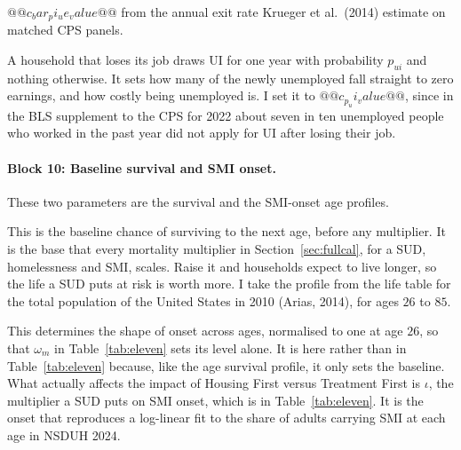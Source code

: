 \documentclass[10pt]{article}
\begin{document}
\begin{description}
$@@c_bar_pi_ue_value@@$ from the annual exit rate Krueger et al.\ (2014) estimate on
matched CPS panels.
\item[$p_{ui}$, the share of separations that receive UI.] A household that
loses its job draws UI for one year with probability $p_{ui}$ and nothing
otherwise. It sets how many of the newly unemployed fall straight to zero
earnings, and how costly being unemployed is. I set it to $@@c_p_ui_value@@$, since in the BLS supplement to the CPS for 2022 about seven in ten unemployed people who worked in the past year did not apply for UI after losing their job.
\end{description}

\paragraph{Block 10: Baseline survival and SMI onset.} These two parameters are the survival and
the SMI-onset age profiles.
\begin{description}\setlength{\itemsep}{0.25em}\setlength{\parskip}{0em}
\item[$\bar\phi(j)$, baseline survival by age.] This is the baseline chance of surviving to the
next age, before any multiplier. It is the base that every mortality multiplier in Section~\ref{sec:fullcal}, for a SUD, homelessness and SMI, scales. Raise it and households expect to live longer, so the life a SUD puts at risk is worth more. I take the profile from the life table for the total population of the United States in 2010 (Arias, 2014), for ages $26$ to $85$.

\item[$\varsigma_m(j)$, the age profile of SMI onset.] This determines the shape of onset
across ages, normalised to one at age $26$, so that $\omega_m$ in Table~\ref{tab:eleven} sets its
level alone. It is here rather than in Table~\ref{tab:eleven} because, like the age survival profile, it only sets the
baseline. What actually affects the impact of Housing First versus Treatment First is $\iota$, the multiplier a SUD puts
on SMI onset, which is in Table~\ref{tab:eleven}. It is the onset that
reproduces a log-linear fit to the share of adults carrying SMI at each age in NSDUH
2024.
\end{description}
\end{document}
